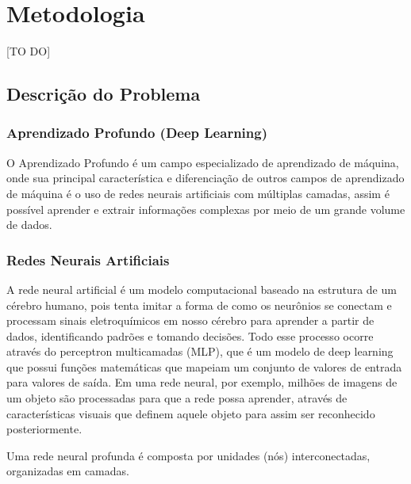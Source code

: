 \chapter{Metodologia}\label{chap:metodologia}

[TO DO]

\section{Descrição do Problema}

\subsection{Aprendizado Profundo (Deep Learning)}
O Aprendizado Profundo é um campo especializado de aprendizado de máquina, onde sua principal característica e diferenciação de outros campos de aprendizado de máquina é o uso de redes neurais artificiais com múltiplas camadas, assim é possível aprender e extrair informações complexas por meio de um grande volume de dados.

\subsection{Redes Neurais Artificiais}
A rede neural artificial é um modelo computacional baseado na estrutura de um cérebro humano, pois tenta imitar a forma de como os neurônios se conectam e processam sinais eletroquímicos em nosso cérebro para aprender a partir de dados,
identificando padrões e tomando decisões. Todo esse processo ocorre através do perceptron multicamadas (MLP), que é um modelo de deep learning que possui funções matemáticas que mapeiam um conjunto de valores de entrada para valores de saída.
Em uma rede neural, por exemplo, milhões de imagens de um objeto são processadas para que a rede possa aprender, através de características visuais que definem aquele objeto para assim ser reconhecido posteriormente.

Uma rede neural profunda é composta por unidades (nós) interconectadas, organizadas em camadas.


